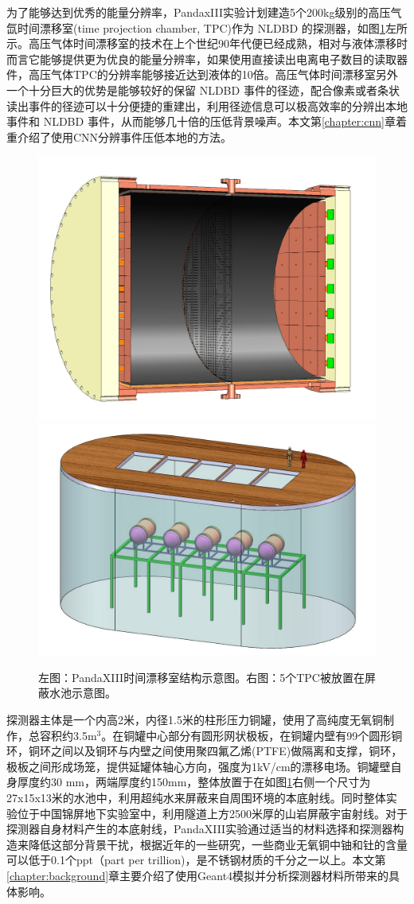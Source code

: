 为了能够达到优秀的能量分辨率，PandaxIII实验计划建造5个200kg级别的高压气氙时间漂移室(time projection chamber, TPC)作为 NLDBD 的探测器，如图\ref{fig:detector}左所示。高压气体时间漂移室的技术在上个世纪90年代便已经成熟，相对与液体漂移时而言它能够提供更为优良的能量分辨率，如果使用直接读出电离电子数目的读取器件，高压气体TPC的分辨率能够接近达到液体的10倍。高压气体时间漂移室另外一个十分巨大的优势是能够较好的保留 NLDBD 事件的径迹，配合像素或者条状读出事件的径迹可以十分便捷的重建出，利用径迹信息可以极高效率的分辨出本地事件和 NLDBD 事件，从而能够几十倍的压低背景噪声。本文第\ref{chapter:cnn}章着重介绍了使用CNN分辨事件压低本地的方法。

\begin{figure}[tbp]
    \centering
    \includegraphics[width=0.4\columnwidth]{pic/fig1.png}
    \includegraphics[width=0.4\columnwidth]{pic/fig2.jpg}
    \caption{左图：PandaXIII时间漂移室结构示意图。右图：5个TPC被放置在屏蔽水池示意图。\supercite{cdr}}
    \label{fig:detector}
\end{figure}
    
探测器主体是一个内高2米，内径1.5米的柱形压力铜罐，使用了高纯度无氧铜制作，总容积约3.5m$^3$。在铜罐中心部分有圆形网状极板，在铜罐内壁有99个圆形铜环，铜环之间以及铜环与内壁之间使用聚四氟乙烯(PTFE)做隔离和支撑，铜环，极板之间形成场笼，提供延罐体轴心方向，强度为1kV/cm的漂移电场。铜罐壁自身厚度约30
mm，两端厚度约150mm，整体放置于在如图\ref{fig:detector}右侧一个尺寸为27x15x13米的水池中，利用超纯水来屏蔽来自周围环境的本底射线。同时整体实验位于中国锦屏地下实验室中，利用隧道上方2500米厚的山岩屏蔽宇宙射线。对于探测器自身材料产生的本底射线，PandaXIII实验通过适当的材料选择和探测器构造来降低这部分背景干扰，根据近年的一些研究，一些商业无氧铜中铀和钍的含量可以低于0.1个ppt（part per trillion)\supercite{abgrall2016majorana}，是不锈钢材质的千分之一以上。本文第\ref{chapter:background}章主要介绍了使用Geant4模拟并分析探测器材料所带来的具体影响。

